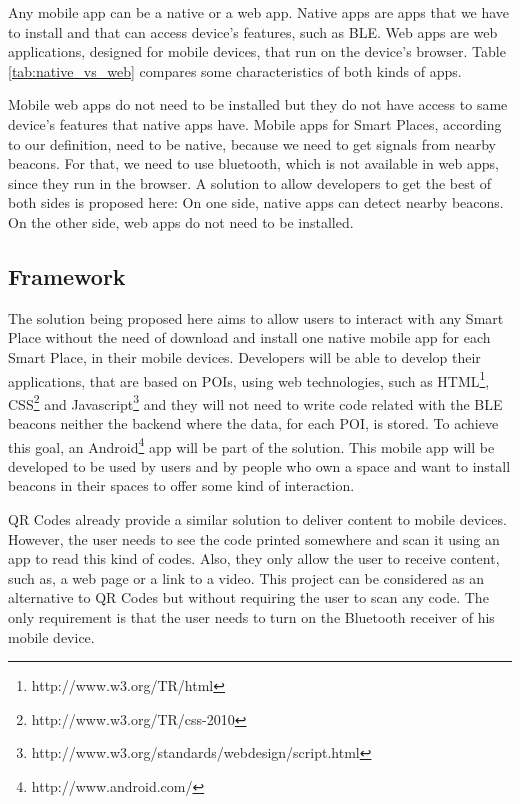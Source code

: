 Any mobile app can be a native or a web app. Native apps
are apps that we have to install and that can access
device's features, such as BLE. Web apps are web
applications, designed for mobile devices, that run
on the device's browser. Table \ref{tab:native_vs_web}
compares some characteristics of both kinds of apps.


Mobile web apps do not need to be
installed but they do not have access
to same device's features that native apps have.
Mobile apps for Smart Places, according to our definition,
need to be native, because we need to get signals from
nearby beacons. For that, we need to use bluetooth, which is
not available in web apps, since they run in the browser.
A solution to allow developers to get the best of both sides
is proposed here: On one side,
native apps can detect nearby beacons. On the other side,
web apps do not need to be installed.

\subsection{Framework}
\label{sub:framework}
The solution being proposed here aims to allow
users to interact with any Smart Place without
the need of download and install one native
mobile app for each Smart Place, in their mobile 
devices.
Developers will be able to develop their
applications, that are based on POIs, using
web technologies, such as 
HTML\footnote{http://www.w3.org/TR/html}, 
CSS\footnote{http://www.w3.org/TR/css-2010}
and 
Javascript\footnote{http://www.w3.org/standards/webdesign/script.html}
and they will not need to write code related with
the BLE beacons neither the backend where the data,
for each POI, is stored.
To achieve this goal, an 
Android\footnote{http://www.android.com/}
app will be part
of the solution. This mobile app will be developed
to be used by users and by people who own a space
and want to install beacons in their spaces to
offer some kind of interaction.

QR Codes already provide a similar solution to
deliver content to mobile devices.
However, the user needs to see the code printed
somewhere and scan it using an app to read
this kind of codes.
Also, they only allow the user to receive content,
such as, a web page or a link to a video.
This project can be considered as an alternative
to QR Codes but without requiring the user
to scan any code. The only requirement is that
the user needs to turn on the Bluetooth receiver
of his mobile device.

